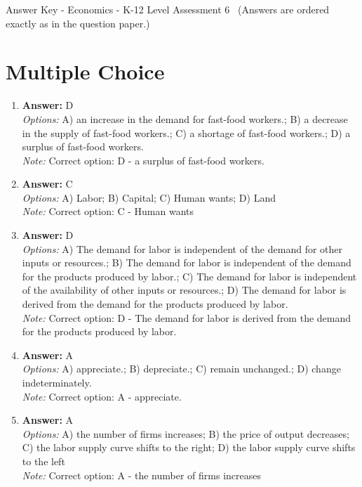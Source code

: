 \documentclass[12pt]{article}
\begin{document}
\begin{center}
Answer Key - Economics - K-12 Level Assessment 6 \
\small (Answers are ordered exactly as in the question paper.)
\end{center}

\section*{Multiple Choice}
\begin{enumerate}[label=\arabic*.]
\item \textbf{Answer:} D
\\ \textit{Options:} A) an increase in the demand for fast-food workers.; B) a decrease in the supply of fast-food workers.; C) a shortage of fast-food workers.; D) a surplus of fast-food workers.
\\ \textit{Note:} Correct option: D - a surplus of fast-food workers.
\item \textbf{Answer:} C
\\ \textit{Options:} A) Labor; B) Capital; C) Human wants; D) Land
\\ \textit{Note:} Correct option: C - Human wants
\item \textbf{Answer:} D
\\ \textit{Options:} A) The demand for labor is independent of the demand for other inputs or resources.; B) The demand for labor is independent of the demand for the products produced by labor.; C) The demand for labor is independent of the availability of other inputs or resources.; D) The demand for labor is derived from the demand for the products produced by labor.
\\ \textit{Note:} Correct option: D - The demand for labor is derived from the demand for the products produced by labor.
\item \textbf{Answer:} A
\\ \textit{Options:} A) appreciate.; B) depreciate.; C) remain unchanged.; D) change indeterminately.
\\ \textit{Note:} Correct option: A - appreciate.
\item \textbf{Answer:} A
\\ \textit{Options:} A) the number of firms increases; B) the price of output decreases; C) the labor supply curve shifts to the right; D) the labor supply curve shifts to the left
\\ \textit{Note:} Correct option: A - the number of firms increases
\end{enumerate}
\end{document}
